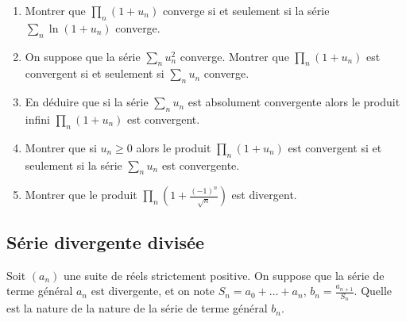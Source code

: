\begin{enumerate}
    \item Montrer que $\prod\limits_n(1+u_n)$ converge si et seulement si la série $\sum\limits_n \ln(1+u_n)$ converge.
    \item On suppose que la série $\sum\limits_n u_n^2$ converge. Montrer que $\prod\limits_n(1+u_n)$ est convergent si et seulement si $\sum\limits_n u_n$ converge.
    \item En déduire que si la série $\sum\limits_n u_n$ est absolument convergente alors le produit infini $\prod\limits_n (1+u_n)$ est convergent.
    \item Montrer que si $u_n \geqslant 0$ alors le produit $\prod\limits_n(1+u_n)$ est convergent si et seulement si la série $\sum\limits_n u_n$ est convergente.
    \item Montrer que le produit $\prod\limits_n\left(1+\frac{(-1)^n}{\sqrt{n}}\right)$ est divergent.
\end{enumerate}


\subsection{Série divergente divisée}

Soit $(a_n)$ une suite de réels strictement positive. On suppose que la série de terme général $a_n$ est divergente, et on note $S_n = a_0 + \ldots + a_n$, $b_n=\frac{a_{n+1}}{S_n}$. Quelle est la nature de la nature de la série de terme général $b_n$.


